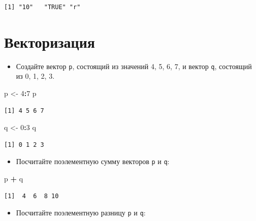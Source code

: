 \documentclass[
]{book}
\newenvironment{Shaded}{\begin{snugshade}}{\end{snugshade}}
\newcommand{\DecValTok}[1]{\textcolor[rgb]{0.00,0.00,0.81}{#1}}
\newcommand{\NormalTok}[1]{#1}
\newcommand{\OperatorTok}[1]{\textcolor[rgb]{0.81,0.36,0.00}{\textbf{#1}}}
\newcommand{\StringTok}[1]{\textcolor[rgb]{0.31,0.60,0.02}{#1}}
\providecommand{\tightlist}{%
  \setlength{\itemsep}{0pt}\setlength{\parskip}{0pt}}
\begin{document}
\begin{verbatim}
[1] "10"   "TRUE" "r"   
\end{verbatim}

\hypertarget{solution_vec_ion}{%
\section{Векторизация}\label{solution_vec_ion}}

\begin{itemize}
\tightlist
\item
  Создайте вектор \texttt{p}, состоящий из значений 4, 5, 6, 7, и вектор \texttt{q}, состоящий из 0, 1, 2, 3.
\end{itemize}

\begin{Shaded}
\begin{Highlighting}[]
\NormalTok{p <-}\StringTok{ }\DecValTok{4}\OperatorTok{:}\DecValTok{7}
\NormalTok{p}
\end{Highlighting}
\end{Shaded}

\begin{verbatim}
[1] 4 5 6 7
\end{verbatim}

\begin{Shaded}
\begin{Highlighting}[]
\NormalTok{q <-}\StringTok{ }\DecValTok{0}\OperatorTok{:}\DecValTok{3}
\NormalTok{q}
\end{Highlighting}
\end{Shaded}

\begin{verbatim}
[1] 0 1 2 3
\end{verbatim}

\begin{itemize}
\tightlist
\item
  Посчитайте поэлементную сумму векторов \texttt{p} и \texttt{q}:
\end{itemize}

\begin{Shaded}
\begin{Highlighting}[]
\NormalTok{p }\OperatorTok{+}\StringTok{ }\NormalTok{q}
\end{Highlighting}
\end{Shaded}

\begin{verbatim}
[1]  4  6  8 10
\end{verbatim}

\begin{itemize}
\tightlist
\item
  Посчитайте поэлементную разницу \texttt{p} и \texttt{q}:
\end{itemize}
\end{document}
